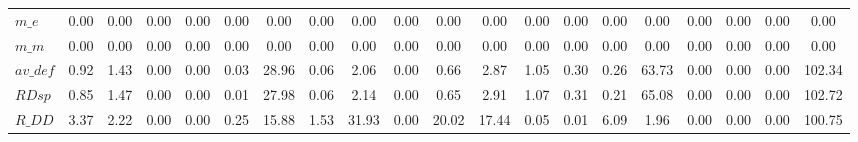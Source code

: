 \begin{center}
\begin{longtable}{lccccccccccccccccccc}
$m\_e                       $	 & 	                0.00	 & 	                0.00	 & 	                0.00	 & 	                0.00	 & 	                0.00	 & 	                0.00	 & 	                0.00	 & 	                0.00	 & 	                0.00	 & 	                0.00	 & 	                0.00	 & 	                0.00	 & 	                0.00	 & 	                0.00	 & 	                0.00	 & 	                0.00	 & 	                0.00	 & 	                0.00	 & 	                0.00 \\ 
$m\_m                       $	 & 	                0.00	 & 	                0.00	 & 	                0.00	 & 	                0.00	 & 	                0.00	 & 	                0.00	 & 	                0.00	 & 	                0.00	 & 	                0.00	 & 	                0.00	 & 	                0.00	 & 	                0.00	 & 	                0.00	 & 	                0.00	 & 	                0.00	 & 	                0.00	 & 	                0.00	 & 	                0.00	 & 	                0.00 \\ 
$av\_def                    $	 & 	                0.92	 & 	                1.43	 & 	                0.00	 & 	                0.00	 & 	                0.03	 & 	               28.96	 & 	                0.06	 & 	                2.06	 & 	                0.00	 & 	                0.66	 & 	                2.87	 & 	                1.05	 & 	                0.30	 & 	                0.26	 & 	               63.73	 & 	                0.00	 & 	                0.00	 & 	                0.00	 & 	              102.34 \\ 
$RDsp                       $	 & 	                0.85	 & 	                1.47	 & 	                0.00	 & 	                0.00	 & 	                0.01	 & 	               27.98	 & 	                0.06	 & 	                2.14	 & 	                0.00	 & 	                0.65	 & 	                2.91	 & 	                1.07	 & 	                0.31	 & 	                0.21	 & 	               65.08	 & 	                0.00	 & 	                0.00	 & 	                0.00	 & 	              102.72 \\ 
$R\_DD                      $	 & 	                3.37	 & 	                2.22	 & 	                0.00	 & 	                0.00	 & 	                0.25	 & 	               15.88	 & 	                1.53	 & 	               31.93	 & 	                0.00	 & 	               20.02	 & 	               17.44	 & 	                0.05	 & 	                0.01	 & 	                6.09	 & 	                1.96	 & 	                0.00	 & 	                0.00	 & 	                0.00	 & 	              100.75 \\ 

\end{longtable}
\end{center}
